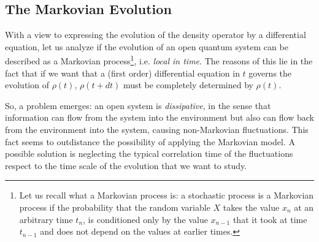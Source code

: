 \subsection{The Markovian Evolution}
With a view to expressing the evolution of the density operator by a differential equation,  let us analyze if the evolution of an open quantum system can be described as a Markovian process\footnote{Let us recall what a Markovian process is: a stochastic process is a Markovian process if the probability that the random variable $X$ takes the value $x_n$ at an arbitrary time $t_n$, is conditioned only by the value $x_{n-1}$ that it took at time $t_{n-1}$ and does not depend on the values at earlier times.}, i.e. \emph{local in time}. The reasons of this lie in the fact that if we want that a (first order) differential equation in $t$ governs the evolution of $\rho(t)$, $\rho(t+dt)$ must be completely determined by $\rho(t)$.

So, a problem emerges: an open system is \emph{dissipative}, in the sense that information can flow from the system into the environment but also can flow back from the environment into the system, causing non-Markovian fluctuations. This fact seems to outdistance the possibility of applying the Markovian model.  A possible solution is neglecting the typical correlation time of the fluctuations respect to the time scale of the evolution that we want to study.

